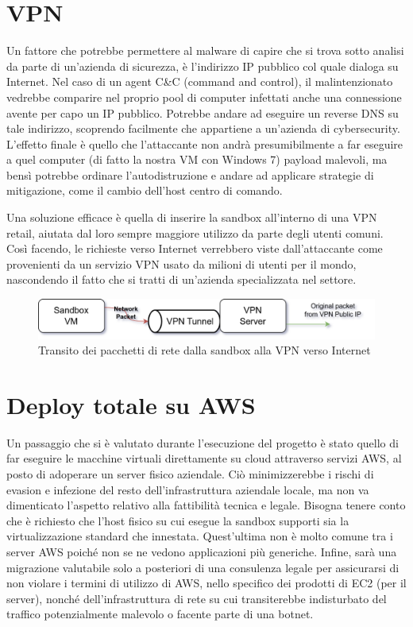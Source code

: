 \section{VPN}
Un fattore che potrebbe permettere al malware di capire che si trova sotto analisi da parte di un'azienda di sicurezza, è l'indirizzo IP pubblico col quale dialoga su Internet.
Nel caso di un agent C\&C (command and control), il malintenzionato vedrebbe comparire nel proprio pool di computer infettati anche una connessione avente per capo un IP pubblico. Potrebbe andare ad eseguire un reverse DNS su tale indirizzo, scoprendo facilmente che appartiene a un'azienda di cybersecurity.
L'effetto finale è quello che l'attaccante non andrà presumibilmente a far eseguire a quel computer (di fatto la nostra VM con Windows 7) payload malevoli, ma bensì potrebbe ordinare l'autodistruzione e andare ad applicare strategie di mitigazione, come il cambio dell'host centro di comando.

Una soluzione efficace è quella di inserire la sandbox all'interno di una VPN retail, aiutata dal loro sempre maggiore utilizzo da parte degli utenti comuni. Così facendo, le richieste verso Internet verrebbero viste dall'attaccante come provenienti da un servizio VPN usato da milioni di utenti per il mondo, nascondendo il fatto che si tratti di un'azienda specializzata nel settore.

\begin{figure}[htbp]
    \centering
    \includegraphics[width=\textwidth]{assets/sandbox_vpn.png}
    \caption{Transito dei pacchetti di rete dalla sandbox alla VPN verso Internet}
    \label{fig:sandbox_vpn_diagram}
\end{figure}

\section{Deploy totale su AWS}
Un passaggio che si è valutato durante l'esecuzione del progetto è stato quello di far eseguire le macchine virtuali direttamente su cloud attraverso servizi AWS, al posto di adoperare un server fisico aziendale.
Ciò minimizzerebbe i rischi di evasion e infezione del resto dell'infrastruttura aziendale locale, ma non va dimenticato l'aspetto relativo alla fattibilità tecnica e legale. Bisogna tenere conto che è richiesto che l'host fisico su cui esegue la sandbox supporti sia la virtualizzazione standard che innestata. Quest'ultima non è molto comune tra i server AWS poiché non se ne vedono applicazioni più generiche. Infine, sarà una migrazione valutabile solo a posteriori di una consulenza legale per assicurarsi di non violare i termini di utilizzo di AWS, nello specifico dei prodotti di EC2 (per il server), nonché dell'infrastruttura di rete su cui transiterebbe indisturbato del traffico potenzialmente malevolo o facente parte di una botnet.

